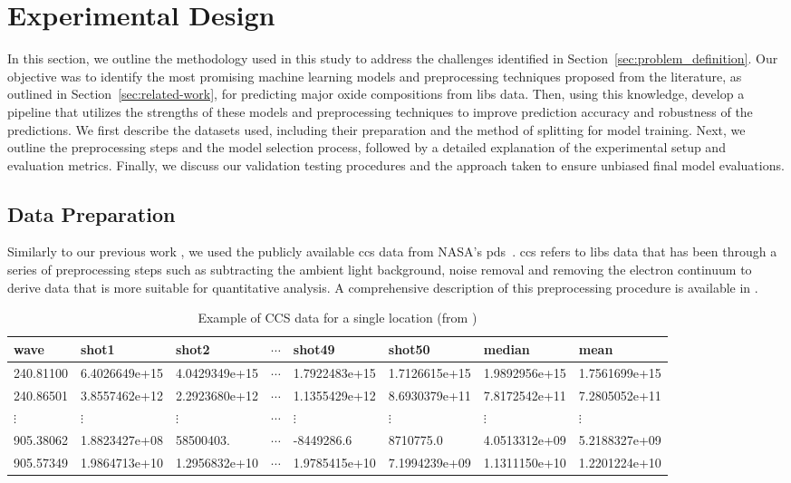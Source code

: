 \section{Experimental Design}\label{sec:methodology}
In this section, we outline the methodology used in this study to address the challenges identified in Section~\ref{sec:problem_definition}. Our objective was to identify the most promising machine learning models and preprocessing techniques proposed from the literature, as outlined in Section~\ref{sec:related-work}, for predicting major oxide compositions from \gls{libs} data.
Then, using this knowledge, develop a pipeline that utilizes the strengths of these models and preprocessing techniques to improve prediction accuracy and robustness of the predictions.
We first describe the datasets used, including their preparation and the method of splitting for model training. Next, we outline the preprocessing steps and the model selection process, followed by a detailed explanation of the experimental setup and evaluation metrics. Finally, we discuss our validation testing procedures and the approach taken to ensure unbiased final model evaluations.


\subsection{Data Preparation}
Similarly to our previous work \citet{p9_paper}, we used the publicly available \gls{ccs} data from NASA's \gls{pds}~\cite{PDSGeoscienceNode}.
\gls{ccs} refers to \gls{libs} data that has been through a series of preprocessing steps such as subtracting the ambient light background, noise removal and removing the electron continuum to derive data that is more suitable for quantitative analysis.
A comprehensive description of this preprocessing procedure is available in \citet{wiensPreflightCalibrationInitial2013}.

\begin{table*}[h]
\centering
\begin{tabular}{llllllll}
\toprule
     wave &         shot1 &         shot2 &  $\cdots$ &        shot49 &       shot50  & median        & mean          \\
\midrule
240.81100 & 6.4026649e+15 & 4.0429349e+15 & $\cdots$  & 1.7922483e+15 & 1.7126615e+15 & 1.9892956e+15 & 1.7561699e+15 \\
240.86501 & 3.8557462e+12 & 2.2923680e+12 & $\cdots$  & 1.1355429e+12 & 8.6930379e+11 & 7.8172542e+11 & 7.2805052e+11 \\
$\vdots$  & $\vdots$      & $\vdots$      & $\cdots$  & $\vdots$      & $\vdots$      & $\vdots$      & $\vdots$      \\
905.38062 & 1.8823427e+08 & 58500403.     & $\cdots$  & -8449286.6    & 8710775.0     & 4.0513312e+09 & 5.2188327e+09 \\
905.57349 & 1.9864713e+10 & 1.2956832e+10 & $\cdots$  & 1.9785415e+10 & 7.1994239e+09 & 1.1311150e+10 & 1.2201224e+10 \\
\bottomrule
\end{tabular}
\caption{Example of CCS data for a single location (from \citet{p9_paper})}
\label{tab:ccs_data_example}
\end{table*}

